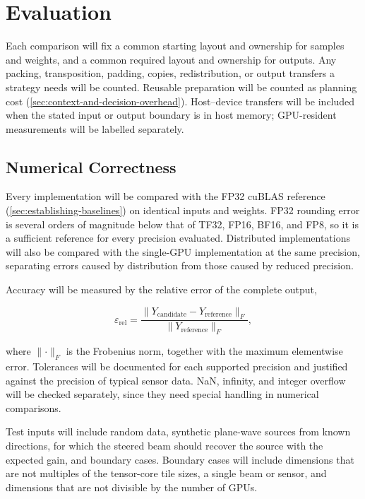 \section{Evaluation}
\label{sec:evaluation}

Each comparison will fix a common starting layout and ownership for samples and weights, and a common required layout and ownership for outputs. Any packing, transposition, padding, copies, redistribution, or output transfers a strategy needs will be counted. Reusable preparation will be counted as planning cost (\cref{sec:context-and-decision-overhead}). Host--device transfers will be included when the stated input or output boundary is in host memory; GPU-resident measurements will be labelled separately.

\subsection{Numerical Correctness}
\label{sec:numerical-correctness}

Every implementation will be compared with the FP32 cuBLAS reference (\cref{sec:establishing-baselines}) on identical inputs and weights. FP32 rounding error is several orders of magnitude below that of TF32, FP16, BF16, and FP8, so it is a sufficient reference for every precision evaluated. Distributed implementations will also be compared with the single-GPU implementation at the same precision, separating errors caused by distribution from those caused by reduced precision.

Accuracy will be measured by the relative error of the complete output,

\[
  \varepsilon_{\mathrm{rel}} =
  \frac{\lVert Y_{\mathrm{candidate}} - Y_{\mathrm{reference}} \rVert_F}
       {\lVert Y_{\mathrm{reference}} \rVert_F},
\]

where $\lVert\cdot\rVert_F$ is the Frobenius norm, together with the maximum elementwise error. Tolerances will be documented for each supported precision and justified against the precision of typical sensor data. NaN, infinity, and integer overflow will be checked separately, since they need special handling in numerical comparisons.

Test inputs will include random data, synthetic plane-wave sources from known directions, for which the steered beam should recover the source with the expected gain, and boundary cases. Boundary cases will include dimensions that are not multiples of the tensor-core tile sizes, a single beam or sensor, and dimensions that are not divisible by the number of GPUs.


